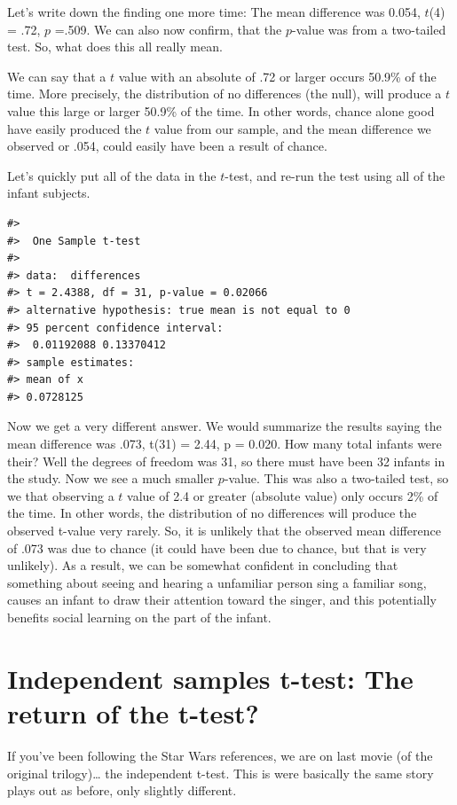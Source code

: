 \documentclass[
  letterpaper,
  DIV=11,
  numbers=noendperiod]{scrreprt}
\begin{document}
Let's write down the finding one more time: The mean difference was
0.054, \(t\)(4) = .72, \(p\) =.509. We can also now confirm, that the
\(p\)-value was from a two-tailed test. So, what does this all really
mean.

We can say that a \(t\) value with an absolute of .72 or larger occurs
50.9\% of the time. More precisely, the distribution of no differences
(the null), will produce a \(t\) value this large or larger 50.9\% of
the time. In other words, chance alone good have easily produced the
\(t\) value from our sample, and the mean difference we observed or
.054, could easily have been a result of chance.

Let's quickly put all of the data in the \(t\)-test, and re-run the test
using all of the infant subjects.

\begin{verbatim}
#> 
#>  One Sample t-test
#> 
#> data:  differences
#> t = 2.4388, df = 31, p-value = 0.02066
#> alternative hypothesis: true mean is not equal to 0
#> 95 percent confidence interval:
#>  0.01192088 0.13370412
#> sample estimates:
#> mean of x 
#> 0.0728125
\end{verbatim}

Now we get a very different answer. We would summarize the results
saying the mean difference was .073, t(31) = 2.44, p = 0.020. How many
total infants were their? Well the degrees of freedom was 31, so there
must have been 32 infants in the study. Now we see a much smaller
\(p\)-value. This was also a two-tailed test, so we that observing a
\(t\) value of 2.4 or greater (absolute value) only occurs 2\% of the
time. In other words, the distribution of no differences will produce
the observed t-value very rarely. So, it is unlikely that the observed
mean difference of .073 was due to chance (it could have been due to
chance, but that is very unlikely). As a result, we can be somewhat
confident in concluding that something about seeing and hearing a
unfamiliar person sing a familiar song, causes an infant to draw their
attention toward the singer, and this potentially benefits social
learning on the part of the infant.

\section{Independent samples t-test: The return of the
t-test?}\label{independent-samples-t-test-the-return-of-the-t-test}

If you've been following the Star Wars references, we are on last movie
(of the original trilogy)\ldots{} the independent t-test. This is were
basically the same story plays out as before, only slightly different.
\end{document}
